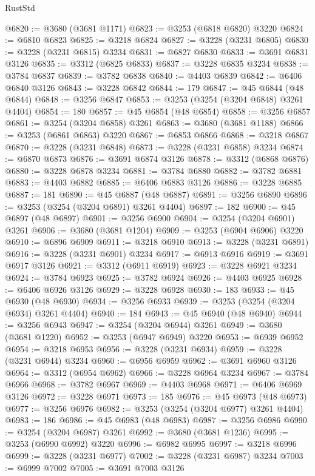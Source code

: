 \begin{lexlean}{RustStd}
\begin{coremodule}
@6820 := @3680 (@3681 @1171)
@6823 := @3253 (@6818 @6820) @3220
@6824 := @6810 @6823
@6825 := @3218 @6824
@6827 := @3228 (@3231 @6805)
@6830 := @3228 (@3231 @6815) @3234
@6831 := @6827 @6830
@6833 := @3691 @6831 @3126
@6835 := @3312 (@6825 @6833)
@6837 := @3228 @6835 @3234
@6838 := @3784 @6837
@6839 := @3782 @6838
@6840 := @4403 @6839
@6842 := @6406 @6840 @3126
@6843 := @3228 @6842
@6844 := 179
@6847 := @45 @6844 (@48 @6844)
@6848 := @3256 @6847
@6853 := @3253 (@3254 (@3204 @6848) @3261 @4404)
@6854 := 180
@6857 := @45 @6854 (@48 @6854)
@6858 := @3256 @6857
@6861 := @3254 (@3204 @6858) @3261
@6863 := @3680 (@3681 @1188)
@6866 := @3253 (@6861 @6863) @3220
@6867 := @6853 @6866
@6868 := @3218 @6867
@6870 := @3228 (@3231 @6848)
@6873 := @3228 (@3231 @6858) @3234
@6874 := @6870 @6873
@6876 := @3691 @6874 @3126
@6878 := @3312 (@6868 @6876)
@6880 := @3228 @6878 @3234
@6881 := @3784 @6880
@6882 := @3782 @6881
@6883 := @4403 @6882
@6885 := @6406 @6883 @3126
@6886 := @3228 @6885
@6887 := 181
@6890 := @45 @6887 (@48 @6887)
@6891 := @3256 @6890
@6896 := @3253 (@3254 (@3204 @6891) @3261 @4404)
@6897 := 182
@6900 := @45 @6897 (@48 @6897)
@6901 := @3256 @6900
@6904 := @3254 (@3204 @6901) @3261
@6906 := @3680 (@3681 @1204)
@6909 := @3253 (@6904 @6906) @3220
@6910 := @6896 @6909
@6911 := @3218 @6910
@6913 := @3228 (@3231 @6891)
@6916 := @3228 (@3231 @6901) @3234
@6917 := @6913 @6916
@6919 := @3691 @6917 @3126
@6921 := @3312 (@6911 @6919)
@6923 := @3228 @6921 @3234
@6924 := @3784 @6923
@6925 := @3782 @6924
@6926 := @4403 @6925
@6928 := @6406 @6926 @3126
@6929 := @3228 @6928
@6930 := 183
@6933 := @45 @6930 (@48 @6930)
@6934 := @3256 @6933
@6939 := @3253 (@3254 (@3204 @6934) @3261 @4404)
@6940 := 184
@6943 := @45 @6940 (@48 @6940)
@6944 := @3256 @6943
@6947 := @3254 (@3204 @6944) @3261
@6949 := @3680 (@3681 @1220)
@6952 := @3253 (@6947 @6949) @3220
@6953 := @6939 @6952
@6954 := @3218 @6953
@6956 := @3228 (@3231 @6934)
@6959 := @3228 (@3231 @6944) @3234
@6960 := @6956 @6959
@6962 := @3691 @6960 @3126
@6964 := @3312 (@6954 @6962)
@6966 := @3228 @6964 @3234
@6967 := @3784 @6966
@6968 := @3782 @6967
@6969 := @4403 @6968
@6971 := @6406 @6969 @3126
@6972 := @3228 @6971
@6973 := 185
@6976 := @45 @6973 (@48 @6973)
@6977 := @3256 @6976
@6982 := @3253 (@3254 (@3204 @6977) @3261 @4404)
@6983 := 186
@6986 := @45 @6983 (@48 @6983)
@6987 := @3256 @6986
@6990 := @3254 (@3204 @6987) @3261
@6992 := @3680 (@3681 @1236)
@6995 := @3253 (@6990 @6992) @3220
@6996 := @6982 @6995
@6997 := @3218 @6996
@6999 := @3228 (@3231 @6977)
@7002 := @3228 (@3231 @6987) @3234
@7003 := @6999 @7002
@7005 := @3691 @7003 @3126

\end{coremodule}
\end{lexlean}
